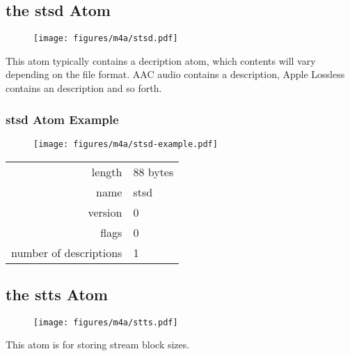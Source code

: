 \clearpage

\subsection{the stsd Atom}
\label{atom:stsd}
\begin{figure}[h]
\texttt{[image: figures/m4a/stsd.pdf]}
\end{figure}
\par
\noindent
This atom typically contains a decription atom,
which contents will vary depending on the file format.
AAC audio contains a  description,
Apple Lossless contains an  description
and so forth.

\subsubsection{stsd Atom Example}
\begin{figure}[h]
  \texttt{[image: figures/m4a/stsd-example.pdf]}
\end{figure}
\begin{tabular}{rl}
  \textsf{length} & 88 bytes \\
  \textsf{name} & \textsf{stsd} \\
  \textsf{version} & 0 \\
  \textsf{flags} & 0 \\
  \textsf{number of descriptions} & 1 \\
\end{tabular}

\clearpage





\subsection{the stts Atom}
\label{atom:stts}
\begin{figure}[h]
  \texttt{[image: figures/m4a/stts.pdf]}
\end{figure}
\par
\noindent
This atom is for storing stream block sizes.
